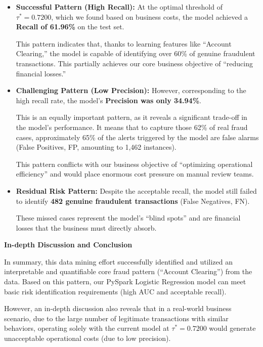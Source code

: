 \documentclass[sigplan,screen]{acmart}
\begin{document}
\begin{itemize}
\item \textbf{Successful Pattern (High Recall):} At the optimal threshold of $\tau^* = 0.7200$, which we found based on business costs, the model achieved a \textbf{Recall of 61.96\%} on the test set.

This pattern indicates that, thanks to learning features like ``Account Clearing,'' the model is capable of identifying over 60\% of genuine fraudulent transactions. This partially achieves our core business objective of ``reducing financial losses.''

\item \textbf{Challenging Pattern (Low Precision):} However, corresponding to the high recall rate, the model's \textbf{Precision was only 34.94\%}.

This is an equally important pattern, as it reveals a significant trade-off in the model's performance. It means that to capture those 62\% of real fraud cases, approximately 65\% of the alerts triggered by the model are false alarms (False Positives, FP, amounting to 1,462 instances).

This pattern conflicts with our business objective of ``optimizing operational efficiency'' and would place enormous cost pressure on manual review teams.

\item \textbf{Residual Risk Pattern:} Despite the acceptable recall, the model still failed to identify \textbf{482 genuine fraudulent transactions} (False Negatives, FN).

These missed cases represent the model's ``blind spots'' and are financial losses that the business must directly absorb.
\end{itemize}

\textbf{In-depth Discussion and Conclusion}

In summary, this data mining effort successfully identified and utilized an interpretable and quantifiable core fraud pattern (``Account Clearing'') from the data. Based on this pattern, our PySpark Logistic Regression model can meet basic risk identification requirements (high AUC and acceptable recall).

However, an in-depth discussion also reveals that in a real-world business scenario, due to the large number of legitimate transactions with similar behaviors, operating solely with the current model at $\tau^* = 0.7200$ would generate unacceptable operational costs (due to low precision).
\end{document}
